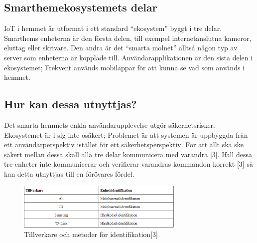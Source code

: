 \documentclass[conference]{IEEEtran}
\begin{document}
\subsection{Smarthemekosystemets delar}
IoT i hemmet är utformat i ett standard “ekosystem” byggt i tre delar. 
Smarthems enheterna är den första delen, till exempel internetanslutna kameror, eluttag eller skrivare. Den andra är det “smarta molnet” alltså någon typ av server som enheterna är kopplade till. Användarapplikationen är den sista delen i ekosystemet; Frekvent används mobilappar för att kunna se vad som används i hemmet.


\subsection{Hur kan dessa utnyttjas?}
Det smarta hemmets enkla användarupplevelse utgör säkerhetsrisker. Ekosystemet är i sig inte osäkert; Problemet är att systemen är uppbyggda från ett användarperspektiv istället för ett säkerhetsperspektiv. För att allt ska ske säkert mellan dessa skall alla tre delar kommunicera med varandra [3]. Ifall dessa tre enheter inte kommunicerar och verifierar varandras kommandon korrekt [3] så kan detta utnyttjas till en förövares fördel.


\begin{figure}[htp]
    \centering
    \includegraphics[width=8cm]{fig1.PNG}
    \caption{Tillverkare och metoder för identifikation[3]}
    \label{fig:Tabell 1}
\end{figure}
\end{document}
